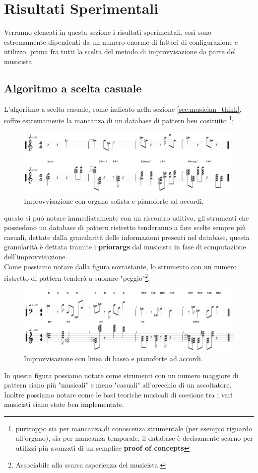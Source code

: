 \section{Risultati Sperimentali}
Verranno elencati in questa sezione i risultati sperimentali, essi
sono estremamente dipendenti da un numero enorme di fattori di configurazione
e utilizzo, prima fra tutti la scelta del metodo di improvvisazione da parte
del musicista.

\subsection{Algoritmo a scelta casuale}
L'algoritmo a scelta casuale, come indicato nella sezione \ref{sec:musician_think},
soffre estremamente la mancanza di un database di pattern ben costruito
\footnote{purtroppo sia per mancanza di conoscenza strumentale
(per esempio riguardo all'organo), sia per mancanza temporale,
il database è decisamente scarno per utilizzi più avanzati di un semplice
\textbf{proof of concepts}};
\\
\begin{figure}[H]
\centering
\includegraphics[width=\textwidth]{img/organmatch.png}
\caption{Improvvisazione con organo solista e pianoforte ad accordi.}
\end{figure}
questo si può notare immediatamente con un riscontro uditivo,
gli strumenti che possiedono un database di pattern ristretto tenderanno
a fare scelte sempre più casuali, dettate dalla granularità delle informazioni
presenti nel database, questa granularità è dettata tramite i \textbf{priorargs}
dal musicista in fase di computazione dell'improvvisazione.\\
Come possiamo notare dalla figura sovrastante, lo strumento con un numero ristretto
di pattern tenderà a suonare "peggio"\footnote{Associabile alla scarsa esperienza del musicista.}.
\\
\begin{figure}[H]
\centering
\includegraphics[width=\textwidth]{img/bassmatch.png}
\caption{Improvvisazione con linea di basso e pianoforte ad accordi.}
\end{figure}
In questa figura possiamo notare come strumenti con un numero maggiore di pattern siano
più "musicali" e meno "casuali" all'orecchio di un ascoltatore.\\
Inoltre possiamo notare come le basi teoriche musicali
di coesione tra i vari musicisti siano state ben implementate.

